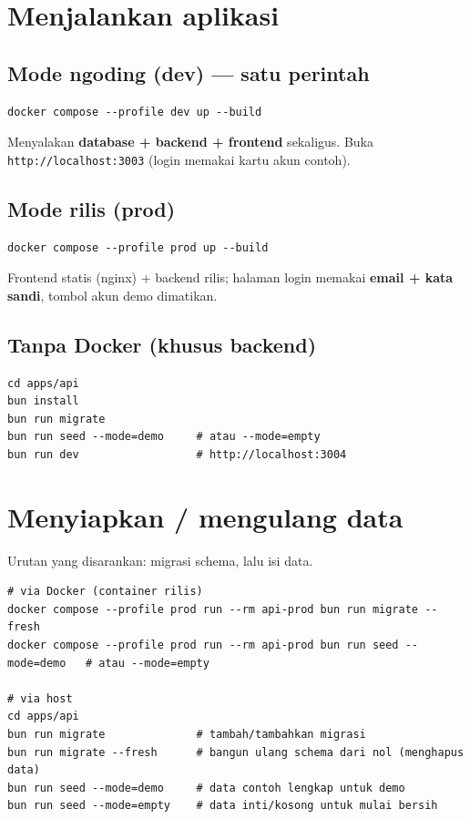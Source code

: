 \documentclass[11pt,a4paper]{article}
\newcommand{\code}[1]{\texttt{#1}}
\begin{document}
\section{Menjalankan aplikasi}

\subsection{Mode ngoding (dev) --- satu perintah}
\begin{lstlisting}
docker compose --profile dev up --build
\end{lstlisting}
Menyalakan \textbf{database + backend + frontend} sekaligus. Buka
\code{http://localhost:3003} (login memakai kartu akun contoh).

\subsection{Mode rilis (prod)}
\begin{lstlisting}
docker compose --profile prod up --build
\end{lstlisting}
Frontend statis (nginx) + backend rilis; halaman login memakai \textbf{email +
kata sandi}, tombol akun demo dimatikan.

\subsection{Tanpa Docker (khusus backend)}
\begin{lstlisting}
cd apps/api
bun install
bun run migrate
bun run seed --mode=demo     # atau --mode=empty
bun run dev                  # http://localhost:3004
\end{lstlisting}

\section{Menyiapkan / mengulang data}

Urutan yang disarankan: migrasi schema, lalu isi data.

\begin{lstlisting}
# via Docker (container rilis)
docker compose --profile prod run --rm api-prod bun run migrate --fresh
docker compose --profile prod run --rm api-prod bun run seed --mode=demo   # atau --mode=empty

# via host
cd apps/api
bun run migrate              # tambah/tambahkan migrasi
bun run migrate --fresh      # bangun ulang schema dari nol (menghapus data)
bun run seed --mode=demo     # data contoh lengkap untuk demo
bun run seed --mode=empty    # data inti/kosong untuk mulai bersih
\end{lstlisting}
\end{document}
